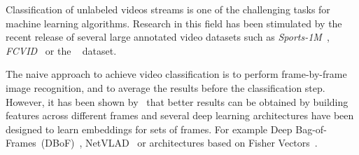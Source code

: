 %
%
%


Classification of unlabeled videos streams is one of the challenging tasks for machine learning algorithms.
Research in this field has been stimulated by the recent release of several large annotated video datasets such as \emph{Sports-1M}~\cite{karpathy2014large}, \emph{FCVID}~\cite{FCVID} or the \yt~\cite{abu2016youtube} dataset.

The naive approach to achieve video classification is to perform frame-by-frame image recognition, and to average the results before the classification step.
However, it has been shown by~\citet{abu2016youtube,miech2017learnable} that better results can be obtained by building features across different frames and several deep learning architectures have been designed to learn embeddings for sets of frames.
For example Deep Bag-of-Frames~(DBoF)~\cite{abu2016youtube}, NetVLAD~\cite{arandjelovic2016netvlad} or architectures based on Fisher Vectors~\cite{perronnin2007fisher}. 

